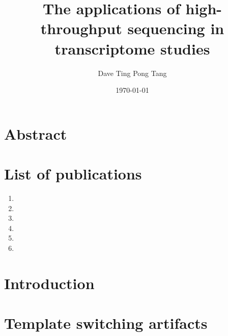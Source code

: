 \documentclass[10pt,a4paper]{report}
\begin{document}
%

\title{
   {The applications of high-throughput sequencing in transcriptome studies}
}

\author{Dave Ting Pong Tang}
\date{\today}
\maketitle

%

\chapter*{Abstract}


\chapter*{List of publications}

\begin{enumerate}
\item {}
\item {}
\item {}
\item {}
\item {}
\item {}
\end{enumerate}

\tableofcontents

\listoffigures



\chapter{Introduction}\label{intro}


\chapter{Template switching artifacts}\label{template_switching}


\end{document}
